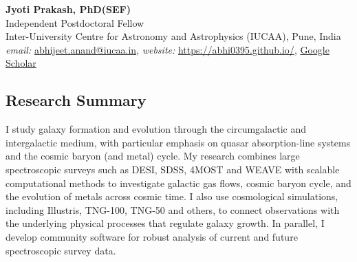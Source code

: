 \documentclass[12pt,letterpaper]{article}
\begin{document}
\thispagestyle{empty}\sloppy\sloppypar\raggedbottom

\textbf{\Large Jyoti Prakash, PhD(SEF)}\\[0.5ex]
Independent Postdoctoral Fellow\\[0.5ex]
Inter-University Centre for Astronomy and Astrophysics (IUCAA), Pune, India\\[0.5ex]
\textsf{\small \textit{email:} \underline{abhijeet.anand@iucaa.in}, \textit{website:} \href{https://abhi0395.github.io/}{https://abhi0395.github.io/}, \href{https://scholar.google.com/citations?hl=en&user=MfOuq1IAAAAJ}{Google Scholar}}\\[0.5ex]

\subsection{Research Summary}

I study galaxy formation and evolution through the circumgalactic and intergalactic medium, with particular emphasis on quasar absorption-line systems and the cosmic baryon (and metal) cycle. My research combines large spectroscopic surveys such as DESI, SDSS, 4MOST and WEAVE with scalable computational methods to investigate galactic gas flows, cosmic baryon cycle, and the evolution of metals across cosmic time. I also use cosmological simulations, including Illustris, TNG-100, TNG-50 and others, to connect observations with the underlying physical processes that regulate galaxy growth. In parallel, I develop community software for robust analysis of current and future spectroscopic survey data.

\vspace{-1.5mm}
\end{document}
